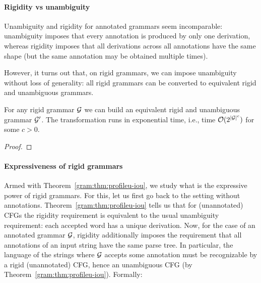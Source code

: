 \paragraph{Rigidity vs unambiguity}
Unambiguity and rigidity for annotated grammars seem
incomparable: unambiguity imposes that every annotation is produced by only one
derivation, whereas rigidity imposes that all derivations across all annotations
have the same shape (but the same annotation may be obtained multiple times).

However, it turns out that, on rigid grammars, we can impose unambiguity without
loss of generality: all rigid grammars can be converted to equivalent rigid and
unambiguous grammars.

\begin{theorem}
  \label{gram:thm:profileu-iou} For any rigid grammar
	$\mathcal{G}$ we can build an equivalent rigid and
	unambiguous grammar $\mathcal{G}'$. The transformation runs in exponential time,
        i.e., time $\mathcal{O}(2^{|\mathcal{G}|^c})$ for some $c> 0$.
\end{theorem}
\begin{proof}
  
\end{proof}




\paragraph{Expressiveness of rigid grammars}
Armed with Theorem~\ref{gram:thm:profileu-iou}, we study what is the expressive power
of rigid grammars. For this, let us first go back to the setting without
annotations. Theorem~\ref{gram:thm:profileu-iou} tells us that for (unannotated) CFGs the rigidity
requirement is equivalent to the usual unambiguity requirement: each accepted
word has a unique derivation.
Now, for the case of an annotated grammar $\mathcal{G}$,
rigidity additionally imposes the requirement
that all annotations of an input string have the same parse tree.
In particular, the language of the strings where $\mathcal{G}$ accepts some
annotation must be recognizable by a rigid (unannotated) CFG, hence an unambiguous CFG (by
Theorem~\ref{gram:thm:profileu-iou}). Formally:

